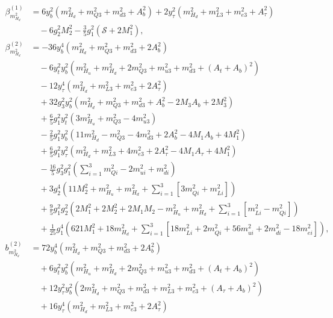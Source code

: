 \documentclass[preprint,amsmath,amssymb,aps,superscriptaddress,prd,showpacs,floatfix]{revtex4-1}
\begin{document}
\begin{subequations}\label{eq:MSSMmHd2Betas}
\begin{align}
\beta_{m_{H_d}^2}^{(1)}&=6y_b^2\left (m_{H_d}^2+m_{Q3}^2+m_{d3}^2+A_b^2 \right )+2y_\tau^2\left ( m_{H_d}^2+m_{L3}^2+m_{e3}^2+A_\tau^2\right )\nonumber\\
&\quad{}-6g_2^2M_2^2-\frac{3}{5}g_1^2\left ( \mathcal{S}+2M_1^2\right ),\label{eq:MSSMmHd2beta1}\\
\beta_{m_{H_d}^2}^{(2)}&=-36y_b^4\left ( m_{H_d}^2+m_{Q3}^2+m_{d3}^2+2A_b^2\right )\nonumber\\
&\quad{}-6y_t^2y_b^2\left ( m_{H_u}^2+m_{H_d}^2+2m_{Q3}^2+m_{u3}^2+m_{d3}^2+(A_t+A_b)^2\right )\nonumber\\
&\quad{}-12y_\tau^4\left ( m_{H_d}^2+m_{L3}^2+m_{e3}^2+2A_\tau^2\right )\nonumber\\
&\quad{}+32g_3^2y_b^2\left ( m_{H_d}^2+m_{Q3}^2+m_{d3}^2+A_b^2-2M_3A_b+2M_3^2\right )\nonumber\\
&\quad{}+\frac{6}{5}g_1^2y_t^2\left ( 3m_{H_u}^2+m_{Q3}^2-4m_{u3}^2\right )\nonumber\\
&\quad{}-\frac{2}{5}g_1^2y_b^2\left ( 11m_{H_d}^2-m_{Q3}^2-4m_{d3}^2+2A_b^2-4M_1A_b+4M_1^2\right )\nonumber\\
&\quad{}+\frac{6}{5}g_1^2y_\tau^2\left ( m_{H_d}^2+m_{L3}^2+4m_{e3}^2+2A_\tau^2-4M_1A_\tau+4M_1^2\right )\nonumber\\
&\quad{}-\frac{16}{5}g_3^2g_1^2\left (\sum_{i=1}^3 m_{Qi}^2-2m_{ui}^2+m_{di}^2 \right )\nonumber\\
&\quad{}+3g_2^4\left ( 11M_2^2+m_{H_u}^2+m_{H_d}^2+\sum_{i=1}^3 [3m_{Qi}^2+m_{Li}^2]\right )\nonumber\\
&\quad{}+\frac{9}{5}g_1^2g_2^2\left ( 2M_1^2+2M_2^2+2M_1M_2-m_{H_u}^2+m_{H_d}^2+\sum_{i=1}^3[m_{Li}^2-m_{Qi}^2]\right )\nonumber\\
&\quad{}+\frac{1}{25}g_1^4\left ( 621M_1^2+18m_{H_d}^2+\sum_{i=1}^3[18m_{Li}^2+2m_{Qi}^2+56m_{ui}^2+2m_{di}^2-18m_{ei}^2]\right ),\label{eq:MSSMmHd2beta2}\\
b_{m_{H_d}^2}^{(2)}&=72y_b^4\left ( m_{H_d}^2+m_{Q3}^2+m_{d3}^2+2A_b^2\right )\nonumber\\
&\quad{}+6y_t^2y_b^2\left ( m_{H_u}^2+m_{H_d}^2+2m_{Q3}^2+m_{u3}^2+m_{d3}^2+(A_t+A_b)^2\right )\nonumber\\
&\quad{}+12y_\tau^2y_b^2\left ( 2m_{H_d}^2+m_{Q3}^2+m_{d3}^2+m_{L3}^2+m_{e3}^2+(A_\tau+A_b)^2\right )\nonumber\\
&\quad{}+16y_\tau^4\left ( m_{H_d}^2+m_{L3}^2+m_{e3}^2+2A_\tau^2\right )\nonumber\\

\end{align}
\end{subequations}
\end{document}
